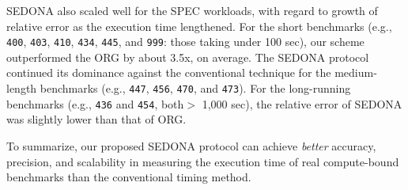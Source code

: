 \documentclass[letter]{ieice}
\begin{document}
SEDONA also scaled well for the SPEC workloads, 
with regard to growth of relative error as the execution time lengthened.
For the short benchmarks 
(e.g., {\tt 400}, {\tt 403}, {\tt 410}, 
{\tt 434}, {\tt 445}, and {\tt 999}: those taking \hbox{under} 100 sec), 
our scheme outperformed the ORG by about 3.5x, on average. 
The SEDONA protocol continued its dominance against the conventional technique 
for the medium-length benchmarks (e.g., {\tt 447}, {\tt 456}, {\tt 470}, and {\tt 473}).
For the long-running benchmarks (e.g., {\tt 436} and {\tt 454}, both$>$ 1,000 sec), 
the relative error of \hbox{SEDONA} was slightly lower than that of ORG.

 

To summarize, our proposed SEDONA protocol can achieve {\em better} accuracy,
precision, and scalability in measuring the execution time of real \hbox{compute-bound} benchmarks 
than the conventional timing method.
\end{document}
